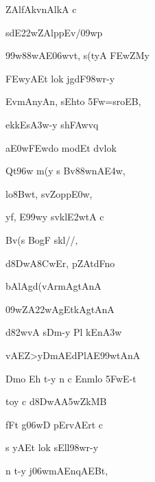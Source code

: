 \dnnemslokab 
{\dn {}ZAlfAkvnAlkA c \dandadn\dontdisplaylinenum}

\dnnemslokac 
{\dn sdE\322wZAl\?ppEv/\309wp}
\dontdisplaylinenum

\dnnemslokad 
{\dn \399w\388wAE\306wvt, s(tyA \3FEwZMy \vegdn\dontdisplaylinenum}


\ujvers\dnnemsloka 
{\dn \3FEwyAEt lok\2 jgdF\398wr-y}
\dontdisplaylinenum

\dnnemslokab 
{\dn EvmAnyAn\4, sEhto \35Fw=sroEB, \dandadn\dontdisplaylinenum}

\dnnemslokac 
{\dn ek\4kEs\3A3w-y sh\3FAwvq\0}
\dontdisplaylinenum

\dnnemslokad 
{\dn a\3E0w\3FEwdo modEt d\?vlok\? \vegdn\dontdisplaylinenum}


\ujvers\dnnemsloka 
{\dn Qt\396w m(y\?{\qvb} s Bv\?\388wnA\3E4w,}
\dontdisplaylinenum

\dnnemslokab 
{\dn {}lo\38Bwt, sv\0Zopp\3E0w, \dandadn\dontdisplaylinenum}

\dnnemslokac 
{\dn yf, E\399wy\2 sv\0kl\3E2wtA c}
\dontdisplaylinenum

\dnnemslokad 
{\dn Bv\?(s BogF skl//, \vegdn\dontdisplaylinenum}


\ujvers\dnnemsloka 
{\dn d\38DwA\38CwEr, pZAt\0dFno}
\dontdisplaylinenum

\dnnemslokab 
{\dn bAlAgd(vArmAgtAnA \dandadn\dontdisplaylinenum}

\dnnemslokac 
{\dn {}\309wZA\322wAgEtkAgtAnA}
\dontdisplaylinenum

\dnnemslokad 
{\dn d\382wvA sDm\0-y Pl\2 kEn\3A3w \vegdn\dontdisplaylinenum}


\ujvers\dnnemsloka 
{\dn vAEZ>yDmA\0EdPlAE\399wtAnA}
\dontdisplaylinenum

\dnnemslokab 
{\dn Dmo{\qvb} Eh t-y n c Enm\0lo \35FwE-t \dandadn\dontdisplaylinenum}

\dnnemslokac 
{\dn toy\2 c d\38DwA\3A5wZ\0kMB}
\dontdisplaylinenum

\dnnemslokad 
{\dn fFt\2 g\306wD\2 pErvAErt\2 c \vegdn\dontdisplaylinenum}


\ujvers\dnnemsloka 
{\dn s yAEt lok\2 sEll\?\398wr-y}
\dontdisplaylinenum

\dnnemslokab 
{\dn n t-y j\306wmAEnqAEBt, \dandadn\dontdisplaylinenum}

